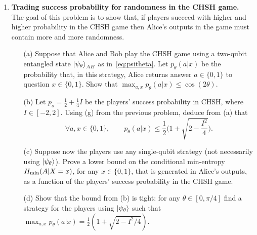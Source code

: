 \documentclass[12pt]{article}
\begin{document}
\begin{enumerate}
\item \textbf{Trading success probability for randomness in the CHSH game.}\\
The goal of this problem is to show that, if players succeed with higher and higher probability in the CHSH game then Alice's outputs in the game must contain more and more randomness. 
\begin{enumerate}
\item[(a)] Suppose that Alice and Bob play the CHSH game using a two-qubit entangled state $\ket{\psi_\theta}_{AB}$ as in~\eqref{eq:psitheta}. Let $p_\theta(a|x)$ be the probability that, in this strategy, Alice returns answer $a\in\{0,1\}$ to question $x\in\{0,1\}$. Show that $\max_{a,x} p_\theta(a|x) \leq \cos (2\theta)$. 
\item[(b)] Let $p_s = \frac{1}{2}+\frac{1}{4}I$ be the players' success probability in CHSH, where $I\in [-2,2]$. Using (g) from the previous problem, deduce from (a) that 
$$\forall a,x\in\{0,1\},\qquad p_\theta(a|x) \leq \frac{1}{2}\Big(1+\sqrt{2-\frac{I^2}{4}}\Big).$$
\item[(c)] Suppose now the players use any single-qubit strategy (not necessarily using $\ket{\psi_\theta}$). Prove a lower bound on the conditional min-entropy $H_{\rm min}(A|X=x)$, for any $x\in \{0,1\}$, that is generated in Alice's outputs, as a function of the players' success probability in the CHSH game. 
\item[(d)] Show that the bound from (b) is tight: for any $\theta\in[0,\pi/4]$ find a strategy for the players using $\ket{\psi_\theta}$ such that $\max_{a,x} p_\theta(a|x) = \frac{1}{2}(1+\sqrt{2-I^2/4})$.
\end{enumerate}

\end{enumerate}
\end{document}

